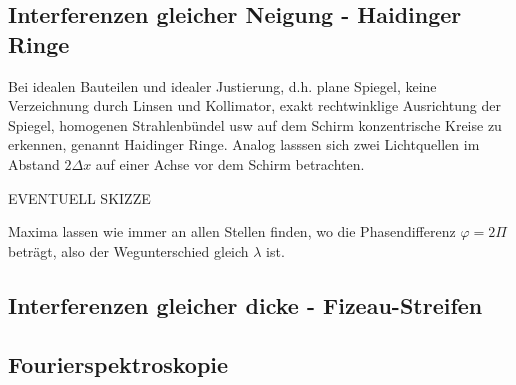 
	\subsection{Interferenzen gleicher Neigung - Haidinger Ringe} %
	\label{sub:interferenzen_gleicher_neigung_haidinger_ringe}

		Bei idealen Bauteilen und idealer Justierung, d.h. plane Spiegel, keine Verzeichnung durch Linsen und Kollimator, exakt rechtwinklige Ausrichtung der Spiegel, homogenen Strahlenbündel usw \sind auf dem Schirm konzentrische Kreise zu erkennen, genannt Haidinger Ringe.
		Analog lasssen sich zwei Lichtquellen im Abstand $2 \Delta x$ auf einer Achse vor dem Schirm betrachten.

		EVENTUELL SKIZZE

		Maxima lassen wie immer an allen Stellen finden, wo die Phasendifferenz $\varphi = 2 \Pi$ beträgt, also der Wegunterschied gleich $\lambda$ ist.



	\subsection{Interferenzen gleicher dicke - Fizeau-Streifen} %
	\label{sub:interferenzen_gleicher_dicke_fizeau_streifen}
	


	\subsection{Fourierspektroskopie} %
	\label{sub:fourierspektroskopie}
		
		
